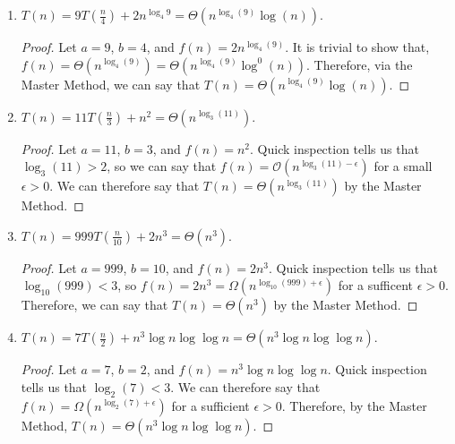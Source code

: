 \documentclass[11pt]{article}
\begin{document}
\begin{enumerate}
\begin{enumerate}
\begin{proof}
\begin{align*}
\lim_{n \to \infty} \frac{f(n)}{g(n)} = \lim_{n \to \infty} \frac{\frac{n}{\log \log n}}{n^{1-\epsilon}}= \lim_{n \to \infty} \frac{n^{\epsilon}}{\log \log n} = \infty.
\end{align*}
So, we can say that $f(n) = \Omega(n^{1-\epsilon}) \text{ } \forall \epsilon>0$.  For the same conditions on $\epsilon$, we can say that $f(n) = \mathcal{O}(n^{1+\epsilon})$.
Therefore we cannot extract any useful information about this recurrence from the Master Method.
\end{proof}
\item $T(n) =  9 T\left(\frac{n}{4}\right) + 2n^{\log_4 9}= \Theta \left(n^{\log_4(9)}\log(n)\right)$.
\begin{proof}
Let $a = 9$, $b=4$, and $f(n) = 2n^{\log_4(9)}$.  It is trivial to show that, $f(n) = \Theta\left(n^{\log_4(9)}\right) = \Theta\left(n^{\log_4(9)}\log^0(n)\right)$.  Therefore, via the Master Method, we can say that $T(n)=\Theta\left(n^{\log_4(9)} \log(n) \right)$. 
\end{proof}
\item $T(n) =  11 T\left(\frac{n}{3}\right) + n^2 = \Theta\left(n^{\log_3(11)}\right)$.
\begin{proof}
Let $a = 11$, $b=3$, and $f(n) = n^2$.  Quick inspection tells us that $\log_3(11)>2$, so we can say that $f(n) = \mathcal{O}\left(n^{\log_3(11)-\epsilon}\right)$ for a small $\epsilon>0$. We can therefore say that $T(n) = \Theta\left(n^{\log_3(11)}\right)$ by the Master Method.
\end{proof}
\item $T(n) = 999 T\left(\frac{n}{10}\right) + 2n^3 = \Theta(n^3)$.
\begin{proof}
Let $a = 999$, $b = 10$, and $f(n) = 2n^3$.  Quick inspection tells us that 
$\log_10(999)<3$, so $f(n) = 2n^3 = \Omega(n^{\log_{10}(999)+ \epsilon})$ for a sufficent $\epsilon>0$.  Therefore, we can say that $T(n) = \Theta(n^3)$ by the Master Method.
\end{proof}
\item $T(n) =  7 T\left(\frac{n}{2}\right) + n^3 \log n \log \log n = \Theta(n^3 \log n \log \log n)$.
\begin{proof}
Let $a= 7$, $b=2$, and $f(n) = n^3 \log n \log \log n$.  Quick inspection tells us that $\log_2(7) < 3$.  We can therefore say that $f(n)= \Omega(n^{\log_2(7)+ \epsilon})$ for a sufficient $\epsilon>0$.  Therefore, by the Master Method, $T(n) = \Theta(n^3 \log n \log \log n)$.
\end{proof}

\end{enumerate}
\end{enumerate}
\end{document}
